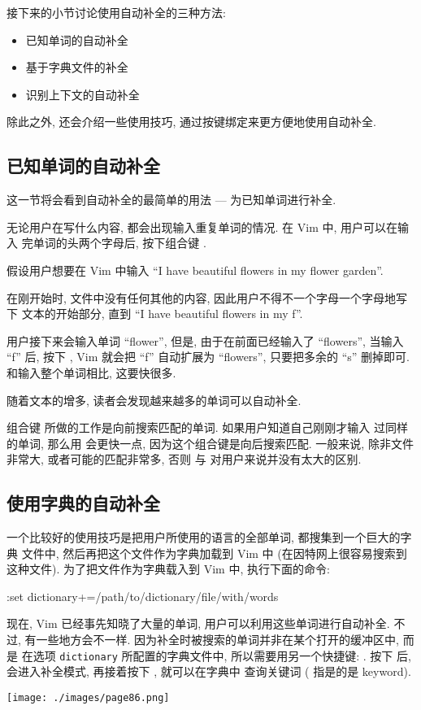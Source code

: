 接下来的小节讨论使用自动补全的三种方法:
\begin{itemize}
    \item 已知单词的自动补全
    \item 基于字典文件的补全
    \item 识别上下文的自动补全
\end{itemize}
除此之外, 还会介绍一些使用技巧, 通过按键绑定来更方便地使用自动补全.

\subsection{已知单词的自动补全}
\label{subsec:autocompletion_with_known_words}

这一节将会看到自动补全的最简单的用法 --- 为已知单词进行补全.

无论用户在写什么内容, 都会出现输入重复单词的情况. 在 Vim 中, 用户可以在输入
完单词的头两个字母后, 按下组合键 .

假设用户想要在 Vim 中输入 ``I have beautiful flowers in my flower garden''.

在刚开始时, 文件中没有任何其他的内容, 因此用户不得不一个字母一个字母地写下
文本的开始部分, 直到 ``I have beautiful flowers in my f''.

用户接下来会输入单词 ``flower'', 但是, 由于在前面已经输入了 ``flowers'',
当输入 ``f'' 后, 按下 , Vim 就会把 ``f'' 自动扩展为 ``flowers'',
只要把多余的 ``s'' 删掉即可. 和输入整个单词相比, 这要快很多.

随着文本的增多, 读者会发现越来越多的单词可以自动补全.

组合键  所做的工作是向前搜索匹配的单词. 如果用户知道自己刚刚才输入
过同样的单词, 那么用  会更快一点, 因为这个组合键是向后搜索匹配.
一般来说, 除非文件非常大, 或者可能的匹配非常多, 否则  与
 对用户来说并没有太大的区别.

\subsection{使用字典的自动补全}
\label{subsec:autocompletion_using_dictionary_lookup}

一个比较好的使用技巧是把用户所使用的语言的全部单词, 都搜集到一个巨大的字典
文件中, 然后再把这个文件作为字典加载到 Vim 中 (在因特网上很容易搜索到这种文件).
为了把文件作为字典载入到 Vim 中, 执行下面的命令:
\begin{vimcode}
:set dictionary+=/path/to/dictionary/file/with/words
\end{vimcode}
现在, Vim 已经事先知晓了大量的单词, 用户可以利用这些单词进行自动补全. 不过,
有一些地方会不一样. 因为补全时被搜索的单词并非在某个打开的缓冲区中, 而是
在选项 \texttt{dictionary} 所配置的字典文件中, 所以需要用另一个快捷键:
.
按下  后, 会进入补全模式, 再接着按下 , 就可以在字典中
查询关键词 ( 指是的是 keyword).
\begin{center}
    \texttt{[image: ./images/page86.png]}
\end{center}

